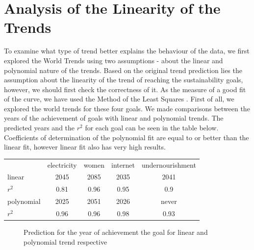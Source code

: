\documentclass[reprint, onecolumn, amsmath, amssymb, showpacs, superscriptaddress, aps, prl]{revtex4-2}
\begin{document}
\section{Analysis of the Linearity of the Trends}
To examine what type of trend better explains the behaviour of the data, we first explored the World Trends using two assumptions - about the linear and polynomial nature of the trends. Based on the original trend prediction lies the assumption about the linearity of the trend of reaching the sustainability goals, however, we should first check the correctness of it. As the measure of a good fit of the curve, we have used the Method of the Least Squares \cite{HESS20015211}. 
First of all, we explored the world trends for these four goals. We made comparisons between the years of the achievement of goals with linear and polynomial trends. The predicted years and the \(r^2\) for each goal can be seen in the table below. Coefficients of determination of the polynomial fit are equal to or better than the linear fit, however linear fit also has very high results.
\begin{table}[h!]
\begin{tabular}{lcccc}
                     & electricity & women & internet & undernourishment \\
linear               & 2045        & 2085  & 2035     & 2041             \\
\(r^2\) & 0.81        & 0.96  & 0.95     & 0.9              \\
polynomial           & 2025        & 2051  & 2026     & never            \\
\(r^2\) & 0.96        & 0.96  & 0.98     & 0.93            
\end{tabular}
\end{table}
\begin{figure}[h!]%
    \centering
    \qquad
    \caption{Prediction for the year of achievement the goal for linear and polynomial trend respective}%
    \label{fig:example}%
\end{figure}
\end{document}
